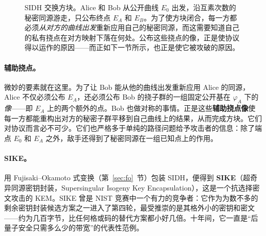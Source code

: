 \begin{figure}[H]
\centering
{}
\caption{SIDH 交换方块。Alice 和 Bob 从公开曲线 $E_0$ 出发，沿互素次数的秘密同源游走，只公布终点 $E_A$ 和 $E_B$。为了使方块闭合，每一方都必须\emph{从对方的曲线出发}重新应用自己的秘密同源，而这需要知道自己的私有挠点在对方映射下落在何处。公布这些挠点的像，正是使协议得以运作的原因——而正如下一节所示，也正是使它被攻破的原因。}
\label{fig:sidh-square}
\end{figure}

\paragraph{辅助挠点。}
微妙的要素就在这里。为了让 Bob 能从他的曲线出发重新应用 Alice 的同源，Alice 不仅必须公布 $E_A$，还必须公布 Bob 的挠子群的一组固定公开基在 $\varphi_A$ 下的\emph{像}——即 $E_A$ 上的两个额外的点。Bob 也做对称的事情。正是这些\textbf{辅助挠点像}使每一方都能重构出对方的秘密子群平移到自己曲线上的结果，从而完成方块。它们对协议而言必不可少。它们也严格多于单纯的路径问题给予攻击者的信息：除了端点 $E_0$ 和 $E_A$ 之外，敌手还得到了秘密同源在一组已知点上的作用。

\paragraph{SIKE。}
用 Fujisaki--Okamoto 式变换（第~\ref{sec:fo}~节）包装 SIDH，便得到 \textbf{SIKE}（超奇异同源密钥封装，Supersingular Isogeny Key Encapsulation），这是一个抗选择密文攻击的 KEM。SIKE 曾是 NIST 竞赛中一个有力的竞争者：它作为为数不多的剩余密钥封装候选方案之一进入了第四轮，最受推崇的是其格外小的密钥和密文——约为几百字节，比任何格或码的替代方案都小好几倍。十年间，它一直是“后量子安全只需多么少的带宽”的代表性范例。

